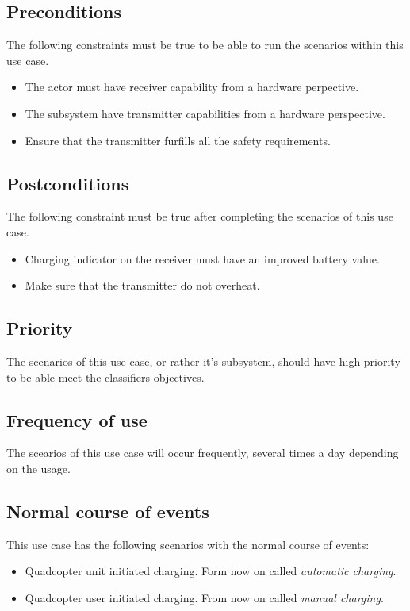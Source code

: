 \documentclass[a4paper]{article}
\begin{document}
\subsection{Preconditions}
The following constraints must be true to be able to run the scenarios within this use case.
\begin{itemize}
	\item The actor must have receiver capability from a hardware perpective.
	\item The subsystem have transmitter capabilities from a hardware perspective.
	\item Ensure that the transmitter furfills all the safety requirements.
\end{itemize}
\subsection{Postconditions}
The following constraint must be true after completing the scenarios of this use case.
\begin{itemize}
	\item Charging indicator on the receiver must have an improved battery value.
	\item Make sure that the transmitter do not overheat.
\end{itemize}
\subsection{Priority}
The scenarios of this use case, or rather it's subsystem, should have high priority to be able meet the classifiers objectives.
\subsection{Frequency of use}
The scearios of this use case will occur frequently, several times a day depending on the usage.
\subsection{Normal course of events}
This use case has the following scenarios with the normal course of events:
\begin{itemize}
	\item Quadcopter unit initiated charging. Form now on called \textit{automatic charging}.
	\item Quadcopter user initiated charging. From now on called \textit{manual charging}.
\end{itemize}
\end{document}
